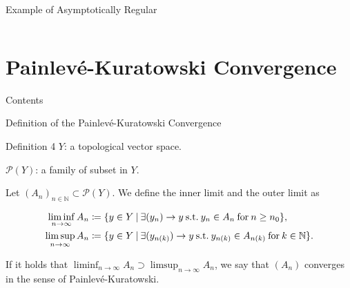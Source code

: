 \documentclass[aspectratio=169, dvipdfmx, 11pt]{beamer} %
\newcommand{\NaturalNumberSet}{\mathbb{N}}
\newcommand{\SuchThat}{\:\text{s.t.}\:}
\newcommand{\Painleve}{Painlev\'e}
\newcommand{\SetForm}[2]{
    \{{#1}\:|\:{#2}\}
}
\begin{document}
\begin{frame}{Example of Asymptotically Regular}
\begin{columns}
\begin{column}{0.48\textwidth}
        \end{column}
    \end{columns}
\end{frame}

\section{\Painleve-Kuratowski Convergence}
\begin{frame}{Contents}
    \tableofcontents[currentsection]
\end{frame}

\begin{frame}{Definition of the \Painleve-Kuratowski Convergence}

    \begin{block}{Definition 4}
    $Y$: a topological vector space.

    $\mathcal{P}(Y)$: a family of subset in $Y$.

    Let $(A_n)_{n \in \NaturalNumberSet} \subset \mathcal{P}(Y)$. We define the inner limit and the outer limit as

    \begin{equation}
        \begin{split}
            \liminf_{n \to \infty}A_n &\coloneqq \SetForm{y \in Y}{\exists (y_n) \to y \SuchThat y_n \in A_n \:\text{for}\: n \geq n_0}, \\
            \limsup_{n \to \infty}A_n &\coloneqq \SetForm{y \in Y}{\exists (y_{n(k)}) \to y \SuchThat y_{n(k)} \in A_{n(k)} \:\text{for}\: k \in \NaturalNumberSet}. \notag
        \end{split}
    \end{equation}

    If it holds that $\liminf_{n \to \infty}A_n \supset \limsup_{n \to \infty}A_n$, we say that $(A_n)$ converges in the sense of \Painleve-Kuratowski.
    \end{block}
\end{frame}
\end{document}
